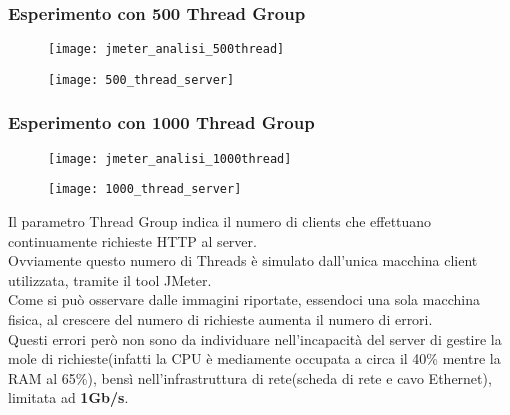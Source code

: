 \subsubsection{Esperimento con 500 Thread Group}
 \begin{minipage}{\linewidth}
 	\centering
 	\begin{minipage}{1\linewidth}
 		\begin{figure}[H]
 			\texttt{[image: jmeter\_analisi\_500thread]}
 		\end{figure}
 	\end{minipage}
 	\begin{minipage}{1\linewidth}
 		\begin{figure}[H]
 			\texttt{[image: 500\_thread\_server]}
    \end{figure}
  \end{minipage}
\end{minipage}

\subsubsection{Esperimento con 1000 Thread Group}
 \begin{minipage}{\linewidth}
 	\centering
 	\begin{minipage}{1\linewidth}
 		\begin{figure}[H]
 			\texttt{[image: jmeter\_analisi\_1000thread]}
 		\end{figure}
 	\end{minipage}
 	\begin{minipage}{1\linewidth}
 		\begin{figure}[H]
 			\texttt{[image: 1000\_thread\_server]}
    \end{figure}
  \end{minipage}
\end{minipage}

\vspace{1cm}
Il parametro Thread Group indica il numero di clients che effettuano continuamente
richieste HTTP al server.\\
Ovviamente questo numero di Threads è simulato dall'unica macchina client utilizzata,
tramite il tool JMeter.\\
Come si può osservare dalle immagini riportate, essendoci una sola macchina fisica,
al crescere del numero di richieste aumenta il numero di errori.\\
Questi errori però non sono da individuare nell'incapacità del server di gestire
la mole di richieste(infatti la CPU è mediamente occupata a circa il 40\% mentre
la RAM al 65\%), bensì nell'infrastruttura di rete(scheda di rete e cavo Ethernet),
limitata ad \textbf{1Gb/s}.\\

